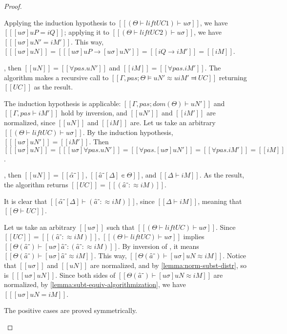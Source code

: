 \begin{proof}
\begin{caseof}
        Applying the induction hypothesis to $[[(Θ  ⊢  lift UC1) ⊢ uσ]]$, we have
        $[[ [uσ]uP = iQ ]]$; applying it to $[[(Θ  ⊢  lift UC2) ⊢ uσ]]$, we have
        $[[ [uσ]uN' = iM' ]]$.
        This way, $[[ [uσ]uN ]] = [[ [uσ]uP → [uσ]uN' ]] = [[ iQ → iM' ]] = [[ iM ]]$.

        \item {}, then $[[uN]] = [[∀pas.uN']]$ and $[[iM]] = [[∀pas.iM']]$.
        The algorithm makes a recursive call to $[[Γ,pas ; Θ ⊨ uN' ≈u iM' ⫤ UC]]$
        returning $[[UC]]$ as the result.

        The induction hypothesis is applicable: $[[Γ,pas ; dom(Θ) ⊢  uN']]$ and $[[Γ,pas ⊢ iM']]$ hold
        by inversion, and $[[uN']]$ and $[[iM']]$ are normalized, since $[[uN]]$ and $[[iM]]$ are.
        Let us take an arbitrary $[[(Θ  ⊢  lift UC) ⊢ uσ]]$.
        By the induction hypothesis, $[[ [uσ]uN' ]] = [[ iM' ]]$. 
        Then $[[ [uσ]uN ]] = [[ [uσ]∀pas.uN' ]] = [[ ∀pas.[uσ]uN' ]] = [[ ∀pas.iM' ]] = [[ iM ]]$.

        \item {}, then $[[uN]] = [[α̂⁻]]$, $[[â⁻[Δ] ∊ Θ]]$, and $[[Δ ⊢ iM]]$.
        As the result, the algorithm returns $[[UC]] = [[ (â⁻ :≈ iM) ]]$.

        It is clear that $[[α̂⁻[Δ] ⊢ (â⁻ :≈ iM) ]]$, since $[[Δ ⊢ iM]]$, 
        meaning that $[[Θ ⊢ UC]]$.

        Let us take an arbitrary $[[uσ]]$ such that  $[[(Θ  ⊢  lift UC) ⊢ uσ]]$.
        Since $[[UC]] = [[ (â⁻ :≈ iM) ]]$, $[[(Θ  ⊢  lift UC) ⊢ uσ]]$ implies 
        $[[Θ(â⁻) ⊢ [uσ]â⁻ : (â⁻ :≈ iM) ]]$.
        By inversion of , it  means $[[Θ(â⁻) ⊢ [uσ]â⁻ ≈ iM]]$.
        This way, $[[Θ(â⁻) ⊢ [uσ]uN ≈ iM]]$. 
        Notice that $[[uσ]]$ and $[[uN]]$ are normalized, and by \cref{lemma:norm-subst-distr}, 
        so is $[[ [uσ]uN ]]$.
        Since both sides of $[[Θ(â⁻) ⊢ [uσ]uN ≈ iM]]$ are normalized,
        by \cref{lemma:subt-equiv-algorithmization}, we have $[[ [uσ]uN = iM ]]$.

        \item The positive cases are proved symmetrically.
    \end{caseof}
\end{proof}

